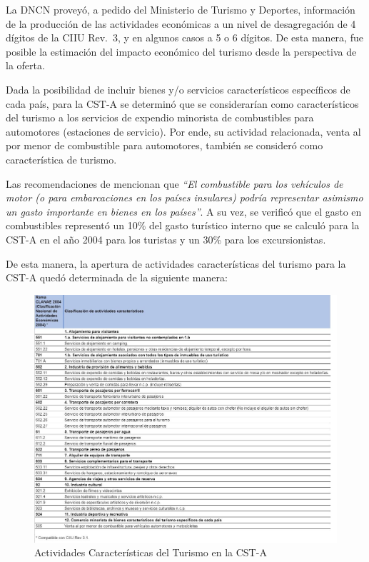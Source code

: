 \documentclass[
  openany]{book}
\begin{document}
La DNCN proveyó, a pedido del Ministerio de Turismo y Deportes, información de la producción de las actividades económicas a un nivel de desagregación de 4 dígitos de la CIIU Rev.~3, y en algunos casos a 5 o 6 dígitos. De esta manera, fue posible la estimación del impacto económico del turismo desde la perspectiva de la oferta.

Dada la posibilidad de incluir bienes y/o servicios característicos específicos de cada país, para la CST-A se determinó que se considerarían como característicos del turismo a los servicios de expendio minorista de combustibles para automotores (estaciones de servicio). Por ende, su actividad relacionada, venta al por menor de combustible para automotores, también se consideró como característica de turismo.

Las recomendaciones de \citet{riet2008} mencionan que \emph{``El combustible para los vehículos de motor (o para embarcaciones en los países insulares) podría representar asimismo un gasto importante en bienes en los países''}. A su vez, se verificó que el gasto en combustibles representó un 10\% del gasto turístico interno que se calculó para la CST-A en el año 2004 para los turistas y un 30\% para los excursionistas.

De esta manera, la apertura de actividades características del turismo para la CST-A quedó determinada de la siguiente manera:

\begin{figure}

{\centering \includegraphics[width=1\linewidth]{imagenes/figura1.3} 

}

\caption{Actividades Características del Turismo en la CST-A}\label{fig:activcst}
\end{figure}
\end{document}

